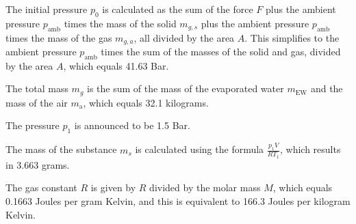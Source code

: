 The initial pressure \( p_0 \) is calculated as the sum of the force \( F \) plus the ambient pressure \( p_{\text{amb}} \) times the mass of the solid \( m_{g,s} \) plus the ambient pressure \( p_{\text{amb}} \) times the mass of the gas \( m_{g,a} \), all divided by the area \( A \). This simplifies to the ambient pressure \( p_{\text{amb}} \) times the sum of the masses of the solid and gas, divided by the area \( A \), which equals 41.63 Bar.

The total mass \( m_g \) is the sum of the mass of the evaporated water \( m_{\text{EW}} \) and the mass of the air \( m_{\text{a}} \), which equals 32.1 kilograms.

The pressure \( p_1 \) is announced to be 1.5 Bar.

The mass of the substance \( m_s \) is calculated using the formula \( \frac{p_1 V}{R T_1} \), which results in 3.663 grams.

The gas constant \( R \) is given by \( R \) divided by the molar mass \( M \), which equals 0.1663 Joules per gram Kelvin, and this is equivalent to 166.3 Joules per kilogram Kelvin.